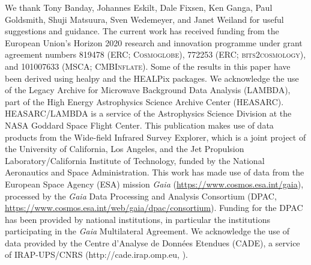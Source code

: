 \documentclass{aa}
\begin{document}
\begin{acknowledgements}
  We thank Tony Banday, Johannes Eskilt, Dale Fixsen, Ken Ganga, Paul
  Goldsmith, Shuji Matsuura, Sven Wedemeyer, and Janet Weiland for useful suggestions
  and guidance.  The current work has received funding from the
  European Union’s Horizon 2020 research and innovation programme
  under grant agreement numbers 819478 (ERC; \textsc{Cosmoglobe}),
  772253 (ERC; \textsc{bits2cosmology}), and 101007633 (MSCA;
  \textsc{CMBInflate}).  Some of the results in this paper have been
  derived using healpy \citep{Zonca2019} and the HEALPix
  \citep{healpix} packages.  We acknowledge the use of the Legacy
  Archive for Microwave Background Data Analysis (LAMBDA), part of the
  High Energy Astrophysics Science Archive Center
  (HEASARC). HEASARC/LAMBDA is a service of the Astrophysics Science
  Division at the NASA Goddard Space Flight Center. This publication
  makes use of data products from the Wide-field Infrared Survey
  Explorer, which is a joint project of the University of California,
  Los Angeles, and the Jet Propulsion Laboratory/California Institute
  of Technology, funded by the National Aeronautics and Space
  Administration. This work has made use of data from the European
  Space Agency (ESA) mission {\it Gaia}
  (\url{https://www.cosmos.esa.int/gaia}), processed by the {\it Gaia}
  Data Processing and Analysis Consortium (DPAC,
  \url{https://www.cosmos.esa.int/web/gaia/dpac/consortium}). Funding
  for the DPAC has been provided by national institutions, in
  particular the institutions participating in the {\it Gaia}
  Multilateral Agreement.
  We acknowledge the use of data provided by the Centre d'Analyse de Données Etendues (CADE), a service of IRAP-UPS/CNRS (http://cade.irap.omp.eu, \citealt{paradis:2012}). 
\end{acknowledgements}


%



\end{document}
